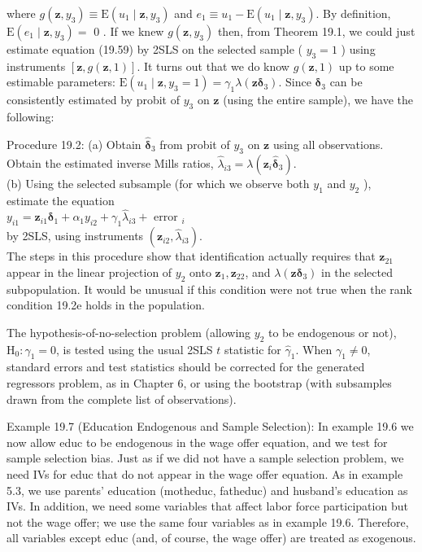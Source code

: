 \documentclass[10pt]{article}
\begin{document}
where $g\left(\mathbf{z}, y_{3}\right) \equiv \mathrm{E}\left(u_{1} \mid \mathbf{z}, y_{3}\right)$ and $e_{1} \equiv u_{1}-\mathrm{E}\left(u_{1} \mid \mathbf{z}, y_{3}\right)$. By definition, $\mathrm{E}\left(e_{1} \mid \mathbf{z}, y_{3}\right)=$ 0 . If we knew $g\left(\mathbf{z}, y_{3}\right)$ then, from Theorem 19.1, we could just estimate equation (19.59) by 2SLS on the selected sample ( $y_{3}=1$ ) using instruments $[\mathbf{z}, g(\mathbf{z}, 1)]$. It turns out that we do know $g(\mathbf{z}, 1)$ up to some estimable parameters: $\mathrm{E}\left(u_{1} \mid \mathbf{z}, y_{3}=1\right)= \gamma_{1} \lambda\left(\mathbf{z} \boldsymbol{\delta}_{3}\right)$. Since $\boldsymbol{\delta}_{3}$ can be consistently estimated by probit of $y_{3}$ on $\mathbf{z}$ (using the entire sample), we have the following:

Procedure 19.2: (a) Obtain $\hat{\boldsymbol{\delta}}_{3}$ from probit of $y_{3}$ on $\mathbf{z}$ using all observations. Obtain the estimated inverse Mills ratios, $\hat{\lambda}_{i 3}=\lambda\left(\mathbf{z}_{i} \hat{\boldsymbol{\delta}}_{3}\right)$.\\
(b) Using the selected subsample (for which we observe both $y_{1}$ and $y_{2}$ ), estimate the equation\\
$y_{i 1}=\mathbf{z}_{i 1} \boldsymbol{\delta}_{1}+\alpha_{1} y_{i 2}+\gamma_{1} \hat{\lambda}_{i 3}+$ error $_{i}$\\
by 2SLS, using instruments $\left(\mathbf{z}_{i 2}, \hat{\lambda}_{i 3}\right)$.\\
The steps in this procedure show that identification actually requires that $\mathbf{z}_{21}$ appear in the linear projection of $y_{2}$ onto $\mathbf{z}_{1}, \mathbf{z}_{22}$, and $\lambda\left(\mathbf{z} \boldsymbol{\delta}_{3}\right)$ in the selected subpopulation. It would be unusual if this condition were not true when the rank condition 19.2e holds in the population.

The hypothesis-of-no-selection problem (allowing $y_{2}$ to be endogenous or not), $\mathrm{H}_{0}: \gamma_{1}=0$, is tested using the usual 2SLS $t$ statistic for $\hat{\gamma}_{1}$. When $\gamma_{1} \neq 0$, standard errors and test statistics should be corrected for the generated regressors problem, as in Chapter 6, or using the bootstrap (with subsamples drawn from the complete list of observations).

Example 19.7 (Education Endogenous and Sample Selection): In example 19.6 we now allow educ to be endogenous in the wage offer equation, and we test for sample selection bias. Just as if we did not have a sample selection problem, we need IVs for educ that do not appear in the wage offer equation. As in example 5.3, we use parents' education (motheduc, fatheduc) and husband's education as IVs. In addition, we need some variables that affect labor force participation but not the wage offer; we use the same four variables as in example 19.6. Therefore, all variables except educ (and, of course, the wage offer) are treated as exogenous.
\end{document}
